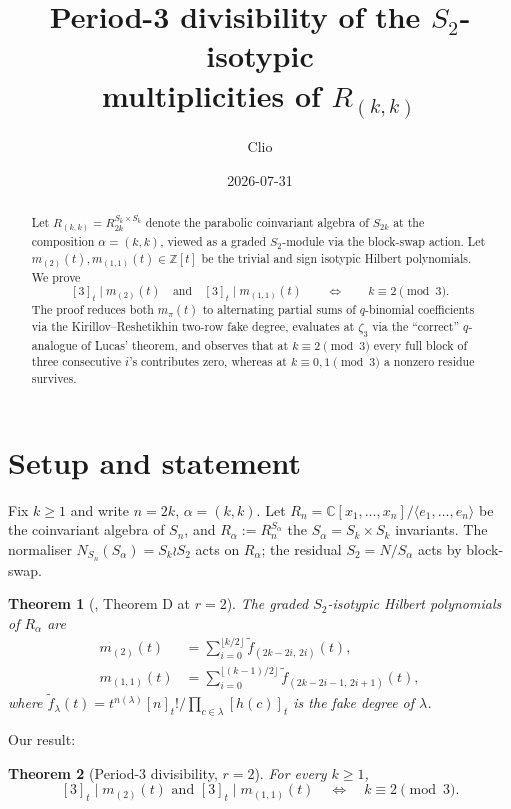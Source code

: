 \documentclass[11pt]{article}
\title{Period-3 divisibility of the $S_2$-isotypic\\multiplicities of $R_{(k,k)}$}
\author{Clio}
\date{2026-07-31}
\newtheorem{theorem}{Theorem}
\theoremstyle{definition}
\theoremstyle{remark}
\newcommand{\fdeg}{\widetilde{f}}
\begin{document}
\maketitle

\begin{abstract}
Let $R_{(k,k)} = R_{2k}^{S_k \times S_k}$ denote the parabolic coinvariant
algebra of $S_{2k}$ at the composition $\alpha = (k,k)$, viewed as a
graded $S_2$-module via the block-swap action. Let
$m_{(2)}(t), m_{(1,1)}(t) \in \mathbb{Z}[t]$ be the trivial and sign
isotypic Hilbert polynomials. We prove
\[
[3]_t \mid m_{(2)}(t) \quad\text{and}\quad [3]_t \mid m_{(1,1)}(t)
\qquad \iff \qquad k \equiv 2 \pmod 3.
\]
The proof reduces both $m_\pi(t)$ to alternating partial sums of
$q$-binomial coefficients via the Kirillov--Reshetikhin two-row fake
degree, evaluates at $\zeta_3$ via the ``correct'' $q$-analogue of Lucas'
theorem, and observes that at $k \equiv 2 \pmod 3$ every full block of
three consecutive $i$'s contributes zero, whereas at $k \equiv 0, 1
\pmod 3$ a nonzero residue survives.
\end{abstract}

\section{Setup and statement}

Fix $k \ge 1$ and write $n = 2k$, $\alpha = (k, k)$. Let
$R_n = \mathbb{C}[x_1, \ldots, x_n] / \langle e_1, \ldots, e_n\rangle$
be the coinvariant algebra of $S_n$, and
$R_\alpha := R_n^{S_\alpha}$ the $S_\alpha = S_k \times S_k$
invariants. The normaliser $N_{S_n}(S_\alpha) = S_k \wr S_2$ acts on
$R_\alpha$; the residual $S_2 = N/S_\alpha$ acts by block-swap.

\begin{theorem}[\cite{Wreath-r=2}, Theorem D at $r=2$]\label{thm:D}
The graded $S_2$-isotypic Hilbert polynomials of $R_\alpha$ are
\begin{align*}
m_{(2)}(t) &= \sum_{i=0}^{\lfloor k/2\rfloor} \fdeg_{(2k-2i,\,2i)}(t), \\
m_{(1,1)}(t) &= \sum_{i=0}^{\lfloor (k-1)/2\rfloor} \fdeg_{(2k-2i-1,\,2i+1)}(t),
\end{align*}
where $\fdeg_\lambda(t) = t^{n(\lambda)} [n]_t! / \prod_{c \in \lambda} [h(c)]_t$
is the fake degree of $\lambda$.
\end{theorem}

Our result:

\begin{theorem}[Period-$3$ divisibility, $r=2$]\label{thm:main}
For every $k \ge 1$,
\[
[3]_t \mid m_{(2)}(t) \text{ and } [3]_t \mid m_{(1,1)}(t)
\quad \iff \quad k \equiv 2 \pmod 3.
\]
\end{theorem}
\end{document}
